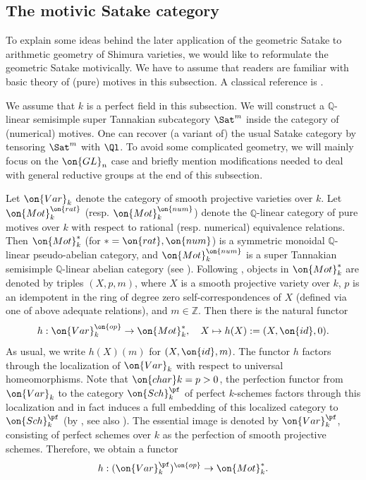 \documentclass[11pt]{amsart}
\theoremstyle{definition}
\theoremstyle{definition}
\theoremstyle{definition}
\numberwithin{equation}{subsection}
\newcommand{\bQ}{{\mathbb Q}}
\newcommand{\bZ}{{\mathbb Z}}
\newcommand{\cha}{{\on{char}}}
\newcommand{\id}{{\on{id}}}
\newcommand{\GL}{{\on{GL}}}
\begin{document}
\subsection{The motivic Satake category}
\label{SS: MotSat}
To explain some ideas behind the later application of the geometric Satake to arithmetic geometry of Shimura varieties, we would like to reformulate the geometric Satake motivically. 
We have to assume that readers are familiar with basic theory of (pure) motives in this subsection. A classical reference is \cite{Kl}. 

We assume that $k$ is a perfect field in this subsection.
We will construct a $\bQ$-linear semisimple super Tannakian subcategory $\Sat^m$ inside the category of (numerical) motives. One can recover (a variant of) the usual Satake category by tensoring $\Sat^m$ with $\Ql$.
To avoid some complicated geometry, we will mainly focus on the $\GL_n$ case and briefly mention modifications needed to deal with general reductive groups at the end of this subsection. 



Let $\on{Var}_k$ denote the category of smooth projective varieties over $k$.
Let $\on{Mot}^{\on{rat}}_k$ (resp. $\on{Mot}_k^{\on{num}}$) denote the $\bQ$-linear category of pure motives over $k$ with respect to rational (resp. numerical) equivalence relations. Then $\on{Mot}_k^*$ (for $*=\on{rat},\on{num}$) is a symmetric monoidal $\bQ$-linear pseudo-abelian category, and $\on{Mot}_k^{\on{num}}$ is a super Tannakian semisimple $\bQ$-linear abelian category (see \cite{Ja}). Following \cite{Ja}, objects in $\on{Mot}_k^{*}$ are denoted by triples $(X,p,m)$, where $X$ is a smooth projective variety over $k$, $p$ is an idempotent in the ring of degree zero self-correspondences of $X$ (defined via one of above adequate relations), and $m\in\bZ$. Then there is the natural  functor
\[h:\on{Var}_k^{\on{op}}\to \on{Mot}^*_k,\quad X\mapsto h(X):=(X,\id,0).\]
As usual, we write $h(X)(m)$ for $(X,\id,m)$.
The functor $h$ factors through the localization of $\on{Var}_k$ with respect to universal homeomorphisms.
Note that $\cha k=p>0$, the perfection functor from $\on{Var}_k$ to the category $\on{Sch}_k^\pf$ of perfect $k$-schemes factors through this localization and in fact induces a full embedding of this localized category to $\on{Sch}_k^\pf$ (by \cite[Corollary A.16, Proposition A.17]{Zh1}, see also \cite[Lemma 3.8, Proposition 3.11]{BS}). The essential image is denoted by $\on{Var}^\pf_k$, consisting of perfect schemes over $k$ as the perfection of smooth projective schemes.
Therefore, we obtain a functor
$$h:(\on{Var}^\pf_k)^{\on{op}}\to\on{Mot}^*_k.$$
\end{document}
